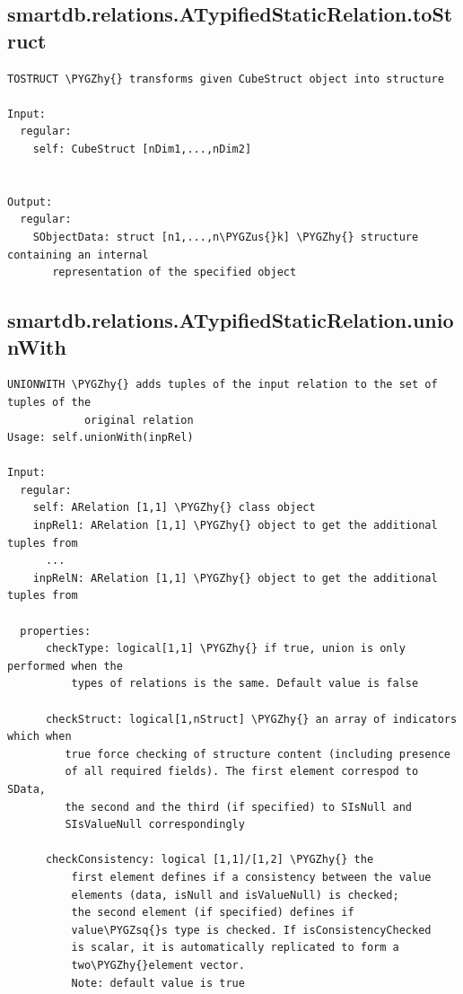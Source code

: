 \documentclass[letterpaper,10pt,english]{sphinxmanual}
\def\PYGZus{\char`\_}
\def\PYGZhy{\char`\-}
\def\PYGZsq{\char`\'}
\begin{document}
\subsection{smartdb.relations.ATypifiedStaticRelation.toStruct}
\label{chap_functions:smartdb-relations-atypifiedstaticrelation-tostruct}
\begin{Verbatim}[commandchars=\\\{\}]
TOSTRUCT \PYGZhy{} transforms given CubeStruct object into structure

Input:
  regular:
    self: CubeStruct [nDim1,...,nDim2]


Output:
  regular:
    SObjectData: struct [n1,...,n\PYGZus{}k] \PYGZhy{} structure containing an internal
       representation of the specified object
\end{Verbatim}


\subsection{smartdb.relations.ATypifiedStaticRelation.unionWith}
\label{chap_functions:smartdb-relations-atypifiedstaticrelation-unionwith}
\begin{Verbatim}[commandchars=\\\{\}]
UNIONWITH \PYGZhy{} adds tuples of the input relation to the set of tuples of the
            original relation
Usage: self.unionWith(inpRel)

Input:
  regular:
    self: ARelation [1,1] \PYGZhy{} class object
    inpRel1: ARelation [1,1] \PYGZhy{} object to get the additional tuples from
      ...
    inpRelN: ARelation [1,1] \PYGZhy{} object to get the additional tuples from

  properties:
      checkType: logical[1,1] \PYGZhy{} if true, union is only performed when the
          types of relations is the same. Default value is false

      checkStruct: logical[1,nStruct] \PYGZhy{} an array of indicators which when
         true force checking of structure content (including presence
         of all required fields). The first element correspod to SData,
         the second and the third (if specified) to SIsNull and
         SIsValueNull correspondingly

      checkConsistency: logical [1,1]/[1,2] \PYGZhy{} the
          first element defines if a consistency between the value
          elements (data, isNull and isValueNull) is checked;
          the second element (if specified) defines if
          value\PYGZsq{}s type is checked. If isConsistencyChecked
          is scalar, it is automatically replicated to form a
          two\PYGZhy{}element vector.
          Note: default value is true
\end{Verbatim}
\end{document}
